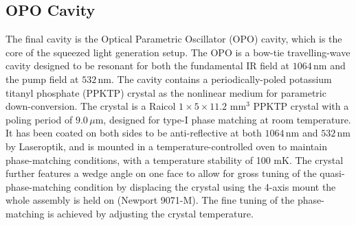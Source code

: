 \subsection{OPO Cavity}
The final cavity is the Optical Parametric Oscillator (OPO) cavity, which is the core of the squeezed light generation setup. The OPO is a bow-tie travelling-wave cavity designed to be resonant for both the fundamental IR field at $1064\,\mathrm{nm}$ and the pump field at $532\,\mathrm{nm}$. The cavity contains a periodically-poled potassium titanyl phosphate (PPKTP) crystal as the nonlinear medium for parametric down-conversion. The crystal is a Raicol $1\times5\times11.2$ mm$^3$ PPKTP crystal with a poling period of $9.0\,\mu\mathrm{m}$, designed for type-I phase matching at room temperature. It has been coated on both sides to be anti-reflective at both $1064\,\mathrm{nm}$ and $532\,\mathrm{nm}$ by Laseroptik, and is mounted in a temperature-controlled oven to maintain phase-matching conditions, with a temperature stability of 100 mK. The crystal further features a wedge angle on one face to allow for gross tuning of the quasi-phase-matching condition by displacing the crystal using the 4-axis mount the whole assembly is held on (Newport 9071-M). The fine tuning of the phase-matching is achieved by adjusting the crystal temperature. \\

